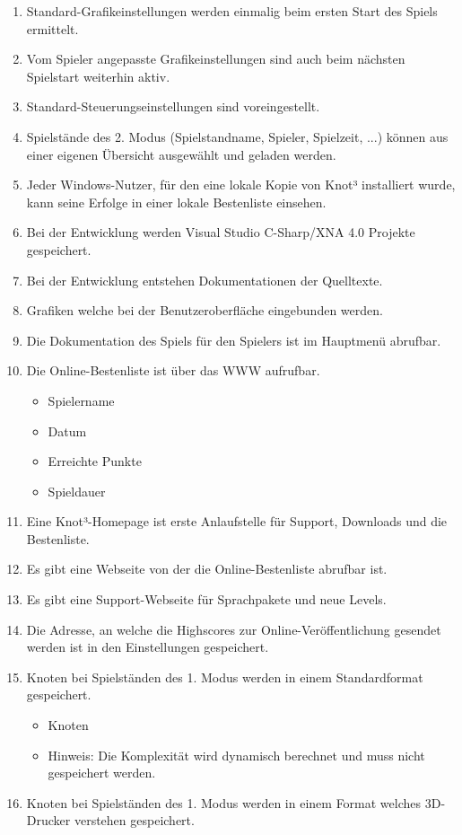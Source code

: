 \begin{enumerate}
\item Standard-Grafikeinstellungen werden einmalig beim ersten Start des Spiels ermittelt.
\item Vom Spieler angepasste Grafikeinstellungen sind auch beim nächsten Spielstart weiterhin aktiv.
\item Standard-Steuerungseinstellungen sind voreingestellt.
\item Spielstände des 2. Modus (Spielstandname, Spieler, Spielzeit, ...) können aus einer eigenen Übersicht ausgewählt und geladen werden.
\item Jeder Windows-Nutzer, für den eine lokale Kopie von Knot³ installiert wurde, kann seine Erfolge in einer lokale Bestenliste einsehen.
\item Bei der Entwicklung werden Visual Studio C-Sharp/XNA 4.0 Projekte gespeichert.
\item Bei der Entwicklung entstehen Dokumentationen der Quelltexte.
\item Grafiken welche bei der Benutzeroberfläche eingebunden werden.
\item Die Dokumentation des Spiels für den Spielers ist im Hauptmenü abrufbar.
\item Die Online-Bestenliste ist über das WWW aufrufbar.

  \begin{itemize}
     \item Spielername
     \item Datum
     \item Erreichte Punkte
     \item Spieldauer
  \end{itemize}
  
\item Eine Knot³-Homepage ist erste Anlaufstelle für Support, Downloads und die Bestenliste.
\item Es gibt eine Webseite von der die Online-Bestenliste abrufbar ist.
\item Es gibt eine Support-Webseite für Sprachpakete und neue Levels.
\item Die Adresse, an welche die Highscores zur Online-Veröffentlichung gesendet werden ist in den Einstellungen gespeichert.
\item Knoten bei Spielständen des 1. Modus werden in einem Standardformat gespeichert.

  \begin{itemize}
     \item Knoten
     \item Hinweis: Die Komplexität wird dynamisch berechnet und muss nicht gespeichert werden.
  \end{itemize}
  
\item Knoten bei Spielständen des 1. Modus werden in einem Format welches 3D-Drucker verstehen gespeichert.



\end{enumerate}



